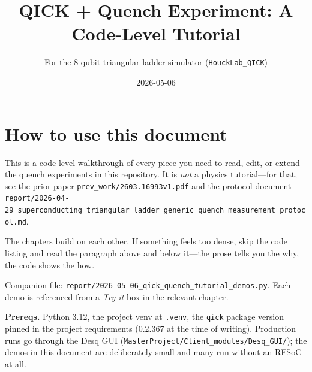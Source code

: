 \documentclass[11pt,letterpaper]{article}
\title{\bfseries QICK + Quench Experiment: A Code-Level Tutorial}
\author{For the 8-qubit triangular-ladder simulator (\texttt{HouckLab\_QICK})}
\date{2026-05-06}
\begin{document}
\maketitle
\tableofcontents
\newpage

\section{How to use this document}
This is a code-level walkthrough of every piece you need to read, edit, or extend the quench experiments in this repository. It is \emph{not} a physics tutorial---for that, see the prior paper \texttt{prev\_work/2603.16993v1.pdf} and the protocol document \texttt{report/2026-04-29\_superconducting\_triangular\_ladder\_generic\_quench\_measurement\_protocol.md}.

The chapters build on each other. If something feels too dense, skip the code listing and read the paragraph above and below it---the prose tells you the why, the code shows the how.

Companion file: \texttt{report/2026-05-06\_qick\_quench\_tutorial\_demos.py}. Each demo is referenced from a \emph{Try it} box in the relevant chapter.

\textbf{Prereqs.} Python 3.12, the project venv at \verb|.venv|, the \texttt{qick} package version pinned in the project requirements (0.2.367 at the time of writing). Production runs go through the Desq GUI (\texttt{MasterProject/Client\_modules/Desq\_GUI/}); the demos in this document are deliberately small and many run without an RFSoC at all.
\end{document}
